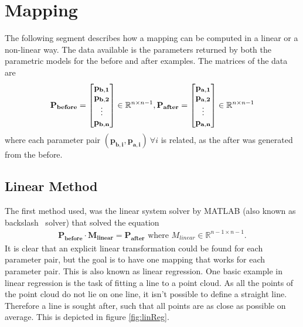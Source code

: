 \section{Mapping}
The following segment describes how a mapping can be computed in a linear or a non-linear way. The data available is the parameters returned by both the parametric models for the before and after examples. The matrices of the data are
\begin{gather}
  \mathbf{P_{before}} =
  \begin{bmatrix}
    \mathbf{p_{b,1}} \\
    \mathbf{p_{b,2}}  \\
    \vdots \\
    \mathbf{p_{b,n}}
  \end{bmatrix}
  \in \mathbb{R}^{n \times n-1},
  \mathbf{P_{after}} =
  \begin{bmatrix}
    \mathbf{p_{a,1}} \\
    \mathbf{p_{a,2}} \\
    \vdots \\
    \mathbf{p_{a,n}}
  \end{bmatrix}
  \in \mathbb{R}^{n \times n-1}
\end{gather}
where each parameter pair $(\mathbf{p_{b,i}}, \mathbf{p_{a,i}})\ \forall i$ is related, as the after was generated from the before.

\subsection{Linear Method}
The first method used, was the linear system solver by MATLAB (also known as backslash \ solver) that solved the equation
\begin{gather}
  \mathbf{P_{before}} \cdot \mathbf{M_{linear}} = \mathbf{P_{after}}
  \text{ where } M_{linear} \in \mathbb{R}^{n-1 \times n-1}.
\end{gather}
It is clear that an explicit linear transformation could be found for each parameter pair, but the goal is to have one mapping that works for each parameter pair. This is also known as linear regression. One basic example in linear regression is the task of fitting a line to a point cloud. As all the points of the point cloud do not lie on one line, it isn't possible to define a straight line. Therefore a line is sought after, such that all points are as close as possible on average. This is depicted in figure \ref{fig:linReg}.

